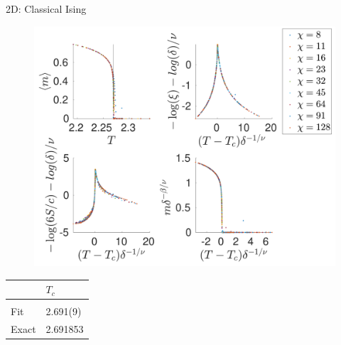 \begin{frame}{2D: Classical Ising}
    \begin{minipage}{.75\textwidth}
        \begin{figure}
            \center
            \includegraphics[height=\textheight]{../Figuren/phasediag/g0/zoomed_small.pdf}
        \end{figure}
    \end{minipage}
    \begin{minipage}{.24\textwidth}
        \begin{table}[]
            \begin{tabular}{l|l }
                      & $T_c$    \\
                \hline           \\
                Fit   & 2.691(9) \\
                Exact & 2.691853 \\

            \end{tabular}
        \end{table}

    \end{minipage}
\end{frame}

